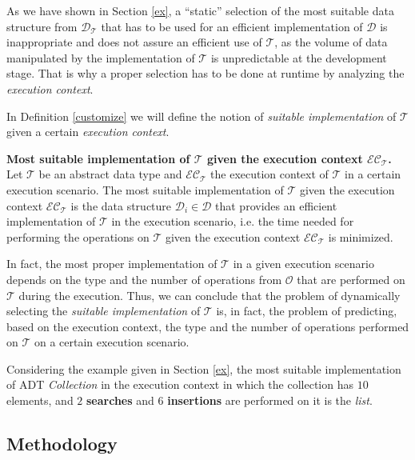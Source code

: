 As we have shown in Section \ref{ex}, a ``static'' selection of the most suitable data structure from $\mathcal{D}_\mathcal{T}$ that has to be used for an efficient implementation of $\mathcal{D}$ is inappropriate and does not assure an efficient use of $\mathcal{T}$, as the volume of data manipulated by the implementation of $\mathcal{T}$ is unpredictable at the development stage. That is why a proper selection has to be done at runtime by analyzing the \emph{execution context}. 

In Definition \ref{customize} we will define the notion of \emph{suitable implementation} of $\mathcal{T}$ given a certain \emph{execution context}.

\begin{definition}\label{customize} \textbf{Most suitable implementation of $\mathcal{T}$ given the execution context $\mathcal{EC}_\mathcal{T}$.} \\
Let $\mathcal{T}$ be an abstract data type and $\mathcal{EC}_\mathcal{T}$ the execution context of $\mathcal{T}$ in a certain execution scenario. The most suitable implementation of $\mathcal{T}$ given the execution context $\mathcal{EC}_\mathcal{T}$ is the data structure $\mathcal{D}_i \in \mathcal{D}$ that provides an efficient implementation of $\mathcal{T}$ in the execution scenario, i.e. the time needed for performing the operations on $\mathcal{T}$ given the execution context $\mathcal{EC}_\mathcal{T}$ is minimized. 
\end{definition} 

In fact, the most proper implementation of $\mathcal{T}$  in a given execution scenario depends on the type and the number of operations from $\mathcal{O}$ that are performed on $\mathcal{T}$ during the execution. Thus, we can conclude that the problem of dynamically selecting the \emph{suitable implementation} of $\mathcal{T}$ is, in fact, the problem of predicting, based on the execution context, the type and the number of operations performed on $\mathcal{T}$ on a certain execution scenario.   

Considering the example given in Section \ref{ex}, the most suitable implementation of ADT \emph{Collection} in the execution context in which the collection has $10$ elements, and $2$ \textbf{searches} and $6$ \textbf{insertions} are performed on it is the \emph{list}.

\subsection{Methodology}
\label{sub:methodologysvm}
 
